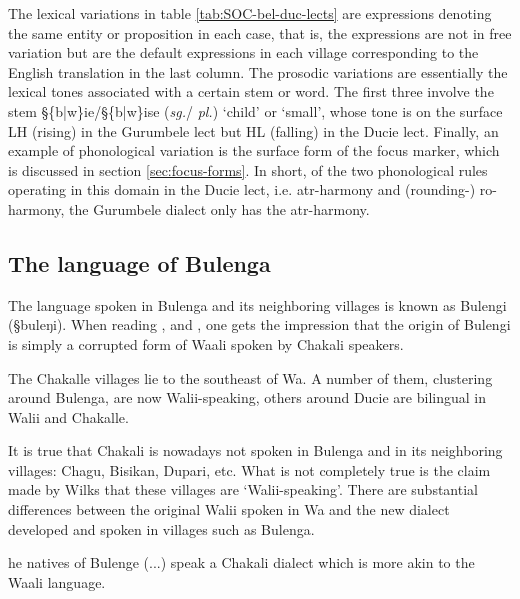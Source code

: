 The lexical variations in table \ref{tab:SOC-bel-duc-lects} are expressions 
denoting the same entity or proposition in each case, that is, the expressions
are
not in free
variation but are the default expressions in each village  corresponding to
the English translation in the last column.  The  prosodic variations
are essentially  the lexical tones associated with a certain stem or  word.
The first three involve the stem {\S \{b|w\}ie}/{\S \{b|w\}ise} ({\it sg.}/{\it
pl.}) `child' or `small', whose tone is on the surface LH (rising) in the
Gurumbele lect 
but HL (falling) in the  Ducie lect. Finally,  an example of   phonological 
variation is
the surface form of the focus marker, which is discussed in section
\ref{sec:focus-forms}. In short, of the two phonological rules operating in
this domain in the Ducie lect, i.e. {\sc atr}-harmony and (rounding-) {\sc
ro}-harmony,   the Gurumbele dialect only has  the {\sc atr}-harmony. 
 

\subsection{The language of Bulenga}
\label{sec:SOC-bulengi}

The language spoken in Bulenga and its neighboring  villages is known as
Bulengi ({\S buleŋi}). When reading \citet[17]{Wilk89},  \citet[163]{Daan94}
and \citet[64]{Sali08}, one gets  the impression that the origin of Bulengi is 
simply a corrupted form of Waali spoken by Chakali speakers. 


\begin{Lquote}
The Chakalle villages lie to the southeast of Wa. A number of them, clustering
around Bulenga, are now Walii-speaking, others around Ducie are bilingual in
Walii and Chakalle.\\[1ex]
\end{Lquote}

\begin{Lquote}
It is true that Chakali is nowadays not spoken in Bulenga and in its
neighboring villages: Chagu, Bisikan, Dupari, etc. What is not completely true
is the claim made by Wilks that these villages are `Walii-speaking'. There are
substantial differences between the original Walii spoken in Wa and the new
dialect developed and spoken in villages such as Bulenga. \\[1ex]
\end{Lquote}

\begin{Lquote}
[T]he natives of Bulenge (...) speak a Chakali dialect which is more akin to the
Waali language.\\[1ex]
\end{Lquote} 



